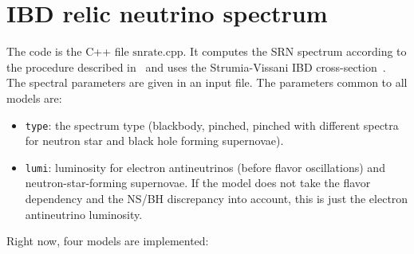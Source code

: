 \documentclass[12pt]{article}
\begin{document}
    \section{IBD relic neutrino spectrum}
    The code is the C++ file $\mathtt{\mathrm{snrate.cpp}}$. It computes the SRN spectrum according to the procedure described in~\cite{Horiuchi:2008jz} and uses the Strumia-Vissani IBD cross-section~\cite{Strumia:2003zx}. The spectral parameters are given in an input file. The parameters common to all models are:
    \begin{itemize}
        \item \texttt{type}: the spectrum type (blackbody, pinched, pinched with different spectra for neutron star and black hole forming supernovae).
        \item \texttt{lumi}: luminosity for electron antineutrinos (before flavor oscillations) and neutron-star-forming supernovae. If the model does not take the flavor dependency and the NS/BH discrepancy into account, this is just the electron antineutrino luminosity. 
    \end{itemize}
    Right now, four models are implemented:
\end{document}
